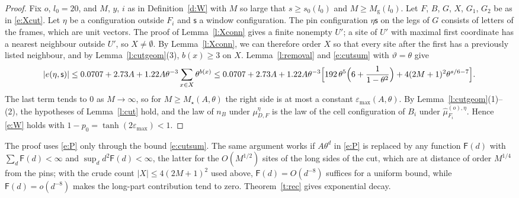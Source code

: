 \begin{proof}
Fix $o$, $l_0 = 20$, and $M$, $y$, $i$ as in Definition~\ref{d:W} with $M$ so large that $s \ge s_0(l_0)$ and $M \ge M_{\mathrm g}(l_0)$. Let $F$, $B$, $G$, $X$, $G_1$, $G_2$ be as in \eqref{e:Xcut}. Let $\eta$ be a configuration outside $F_i$ and $\mathsf s$ a window configuration. The pin configuration $\eta \mathsf s$ on the legs of $G$ consists of letters of the frames, which are unit vectors. The proof of Lemma~\ref{l:Xconn} gives a finite nonempty $U'$; a site of $U'$ with maximal first coordinate has a nearest neighbour outside $U'$, so $X\ne\emptyset$. By Lemma~\ref{l:Xconn}, we can therefore order $X$ so that every site after the first has a previously listed neighbour, and by Lemma~\ref{l:cutgeom}(3), $b(x) \ge 3$ on $X$. Lemma~\ref{l:removal} and \eqref{e:cutsum} with $\vartheta = \theta$ give
\begin{equation*}
|e(\eta, \mathsf s)| \le 0.0707 + 2.73 A + 1.22 A \theta^{-3} \sum_{x \in X} \theta^{b(x)} \le 0.0707 + 2.73 A + 1.22 A \theta^{-3} \Bigl[ 192 \, \theta^{5} \Bigl( 6 + \frac{1}{1 - \theta^2} \Bigr) + 4 (2M + 1)^2 \theta^{s/6 - 7} \Bigr].
\end{equation*}
The last term tends to $0$ as $M \to \infty$, so for $M \ge M_\star(A, \theta)$ the right side is at most a constant $\varepsilon_{\max}(A, \theta)$. By Lemma~\ref{l:cutgeom}(1)--(2), the hypotheses of Lemma~\ref{l:cut} hold, and the law of $n_B$ under $\mu^\eta_{D, F}$ is the law of the cell configuration of $B_i$ under $\hat\mu^{(o), \eta}_{F_i}$. Hence \eqref{e:W} holds with $1 - p_0 = \tanh(2 \varepsilon_{\max}) < 1$.
\end{proof}

\begin{remark}\label{r:Pweak}
The proof uses \eqref{e:P} only through the bound \eqref{e:cutsum}. The same argument works if $A \theta^d$ in \eqref{e:P} is replaced by any function $\mathsf F(d)$ with $\sum_d \mathsf F(d) < \infty$ and $\sup_d d^2 \mathsf F(d) < \infty$, the latter for the $O(M^{1/2})$ sites of the long sides of the cut, which are at distance of order $M^{1/4}$ from the pins; with the crude count $|X|\le4(2M+1)^2$ used above, $\mathsf F(d)=O(d^{-8})$ suffices for a uniform bound, while $\mathsf F(d)=o(d^{-8})$ makes the long-part contribution tend to zero. Theorem~\ref{t:rec} gives exponential decay.
\end{remark}
